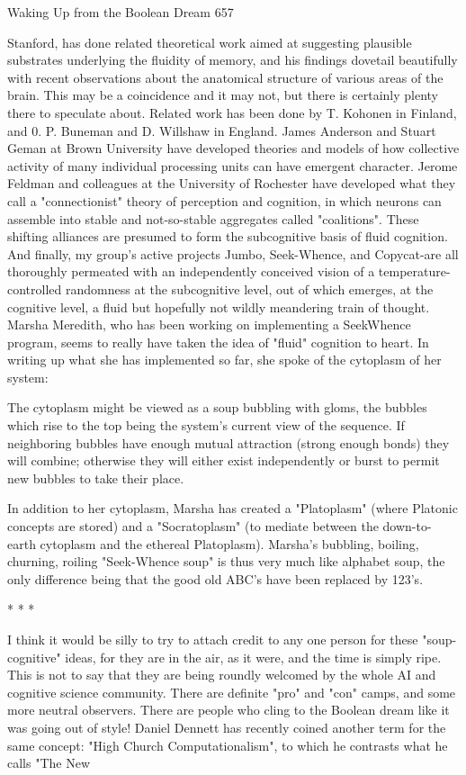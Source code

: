 Waking Up from the Boolean Dream                                                     657

Stanford, has done related theoretical work aimed at suggesting plausible substrates
underlying the fluidity of memory, and his findings dovetail beautifully with recent
observations about the anatomical structure of various areas of the brain. This may be
a coincidence and it may not, but there is certainly plenty there to speculate about.
Related work has been done by T. Kohonen in Finland, and 0. P. Buneman and D.
Willshaw in England. James Anderson and Stuart Geman at Brown University have
developed theories and models of how collective activity of many individual
processing units can have emergent character. Jerome Feldman and colleagues at the
University of Rochester have developed what they call a "connectionist" theory of
perception and cognition, in which neurons can assemble into stable and not-so-stable
aggregates called "coalitions". These shifting alliances are presumed to form the
subcognitive basis of fluid cognition. And finally, my group's active projects Jumbo,
Seek-Whence, and Copycat-are all thoroughly permeated with an independently
conceived vision of a temperature-controlled randomness at the subcognitive level,
out of which emerges, at the cognitive level, a fluid but hopefully not wildly
meandering train of thought.
       Marsha Meredith, who has been working on implementing a SeekWhence
program, seems to really have taken the idea of "fluid" cognition to heart. In writing
up what she has implemented so far, she spoke of the cytoplasm of her system:

   The cytoplasm might be viewed as a soup bubbling with gloms, the bubbles
   which rise to the top being the system's current view of the sequence. If
   neighboring bubbles have enough mutual attraction (strong enough bonds) they
   will combine; otherwise they will either exist independently or burst to permit
   new bubbles to take their place.

        In addition to her cytoplasm, Marsha has created a "Platoplasm" (where
Platonic concepts are stored) and a "Socratoplasm" (to mediate between the down-to-
earth cytoplasm and the ethereal Platoplasm). Marsha's bubbling, boiling, churning,
roiling "Seek-Whence soup" is thus very much like alphabet soup, the only difference
being that the good old ABC's have been replaced by 123's.

                                       *   *   *

        I think it would be silly to try to attach credit to any one person for these
"soup-cognitive" ideas, for they are in the air, as it were, and the time is simply ripe.
This is not to say that they are being roundly welcomed by the whole AI and cognitive
science community. There are definite "pro" and "con" camps, and some more neutral
observers. There are people who cling to the Boolean dream like it was going out of
style! Daniel Dennett has recently coined another term for the same concept: "High
Church Computationalism", to which he contrasts what he calls "The New




